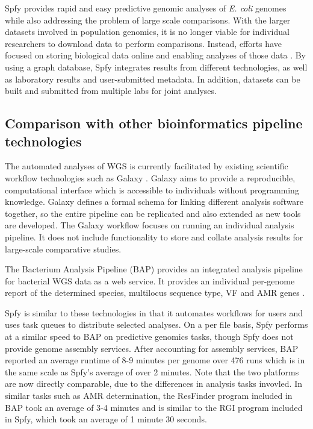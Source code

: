 \documentclass{article}
\begin{document}
Spfy provides rapid and easy predictive genomic analyses of \textit{E. coli} genomes while also addressing the problem of large scale comparisons. With the larger datasets involved in population genomics, it is no longer viable for individual researchers to download data to perform comparisons. Instead, efforts have focused on storing biological data online and enabling analyses of those data \cite{schatz2015biological}. By using a graph database, Spfy integrates results from  different technologies, as well as laboratory results and user-submitted metadata. In addition, datasets can be built and submitted from multiple labs for joint analyses.

\subsection{Comparison with other bioinformatics pipeline technologies}


The automated analyses of WGS is currently facilitated by existing scientific workflow technologies such as Galaxy \cite{goecks2010galaxy}. Galaxy aims to provide a reproducible, computational interface which is accessible to individuals without programming knowledge. Galaxy defines a formal schema for linking different analysis software together, so the entire pipeline can be replicated and also extended as new tools are developed. The Galaxy workflow focuses on running an individual analysis pipeline. It does not include functionality to store and collate analysis results for large-scale comparative studies.

The Bacterium Analysis Pipeline (BAP) \cite{thomsen2016bacterial} provides an integrated analysis pipeline for bacterial WGS data as a web service. It provides an individual per-genome report of the determined species, multilocus sequence type, VF and AMR genes \cite{thomsen2016bacterial}.

Spfy is similar to these technologies in that it automates workflows for users and uses task queues to distribute selected analyses.
On a per file basis, Spfy performs at a similar speed to BAP on predictive genomics tasks, though Spfy does not provide genome assembly services.
After accounting for assembly services, BAP reported \cite{thomsen2016bacterial} an average runtime of 8-9 minutes per genome over 476 runs which is in the same scale as Spfy's average of over 2 minutes.
Note that the two platforms are now directly comparable, due to the differences in analysis tasks invovled.
In similar tasks such as AMR determination, the ResFinder program included in BAP took an average of 3-4 minutes \cite{thomsen2016bacterial} and is similar to the RGI program included in Spfy, which took an average of 1 minute 30 seconds.
\end{document}
